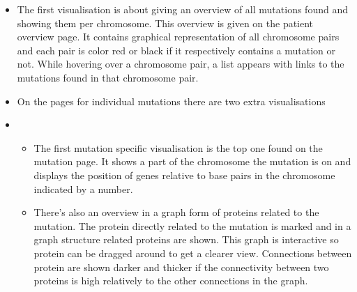 \begin{itemize}
  \item The first visualisation is about giving an overview of all mutations found and showing them per chromosome. This overview is given on the patient overview page. It contains graphical representation of all chromosome pairs and each pair is color red or black if it respectively contains a mutation or not. While hovering over a chromosome pair, a list appears with links to the mutations found in that chromosome pair.
  \item On the pages for individual mutations there are two extra visualisations
  \item
  \begin{itemize}
     \item The first mutation specific visualisation is the top one found on the mutation page. It shows a part of the chromosome the mutation is on and displays the position of genes relative to base pairs in the chromosome indicated by a number.
     \item There's also an overview in a graph form of proteins related to the mutation. The protein directly related to the mutation is marked and in a graph structure related proteins are shown. This graph is interactive so protein can be dragged around to get a clearer view. Connections between protein are shown darker and thicker if the connectivity between two proteins is high relatively to the other connections in the graph.
  \end{itemize}
\end{itemize}